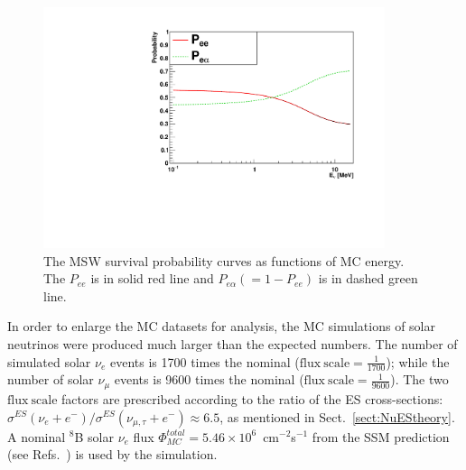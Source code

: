 {\begin{figure}[!htb]
	\centering
	\includegraphics[width=10cm]{PSelmaa_bs05op.pdf}
	\caption[The MSW survival probability curves as functions of MC energies.]{The MSW survival probability curves as functions of MC energy. The $P_{ee}$ is in solid red line and $P_{e\alpha}(=1-P_{ee})$ is in dashed green line.	\label{fig:pselmaa_curves}}
\end{figure}

In order to enlarge the MC datasets for analysis, the MC simulations of solar neutrinos were produced much larger than the expected numbers. The number of simulated solar $\nu_e$ events is 1700 times the nominal ($\mathrm{flux~scale} = \frac{1}{1700}$); while the number of solar $\nu_\mu$ events is 9600 times the nominal ($\mathrm{flux~scale}=\frac{1}{9600}$). The two $\mathrm{flux~scale}$ factors are prescribed according to the ratio of the ES cross-sections: $\sigma^{ES}(\nu_{e}+e^-)/\sigma^{ES}(\nu_{\mu,\tau}+e^-)\approx 6.5$, as mentioned in Sect.~\ref{sect:NuEStheory}. A nominal $^8$B solar $\nu_e$ flux $\Phi^{total}_{MC}=5.46\times 10^6$~cm$^{-2}$s$^{-1}$ from the SSM prediction (see Refs.~\cite{pdg2020,vinyoles2017new}) is used by the simulation.

}

